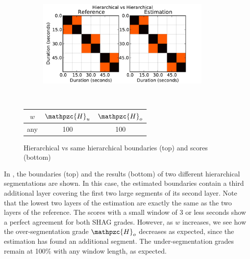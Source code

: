 \documentclass{article}
\def\shag{\ensuremath{\mathpzc{H}}}
\begin{document}
\begin{figure}[t]
  \centering
  \begin{subfigure}{0.5\textwidth}
    \centering
    \includegraphics[width=0.94\textwidth]{plots/hier-hier.pdf}
  \end{subfigure}%
  \\
  \begin{minipage}{0.5\textwidth}
    \centering
    \vspace{10pt}
    \begin{tabular}{|c|c|c|}
      \hline
      $w$       & $\shag_u$    & $\shag_o$      \\
      \hline
      any       & 100       & 100      \\     
      \hline
    \end{tabular}
  \end{minipage}
  \caption{Hierarchical vs same hierarchical boundaries (top) and scores (bottom)}
  \label{fig:hier-hier}
\end{figure}

In , the boundaries (top) and the results (bottom) of two different hierarchical segmentations are shown.
In this case, the estimated boundaries contain a third additional layer covering the first two large segments of its second layer.
Note that the lowest two layers of the estimation are exactly the same as the two layers of the reference.
The scores with a small window of 3 or less seconds show a perfect agreement for both SHAG grades.
However, as $w$ increases, we see how the over-segmentation grade $\shag_o$ decreases as expected, since the estimation has found an additional segment.
The under-segmentation grades remain at 100\% with any window length, as expected.
\end{document}

